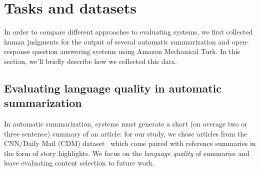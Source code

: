\section{\label{sec:price:tasks} Tasks and datasets}

In order to compare different approaches to evaluating systems, we first collected human judgments for the output of several automatic summarization and open-response question answering systems using Amazon Mechanical Turk.
In this section, we'll briefly describe how we collected this data.

\subsection{Evaluating language quality in automatic summarization}
In automatic summarization, systems must generate a short (on average two or three sentence) summary of an article: for our study, we chose articles from the CNN/Daily Mail (CDM) dataset~\citep{hermann2015read,nallapati2016abstractive} which come paired with reference summaries in the form of story highlights.
We focus on the \textit{language quality} of summaries and leave evaluating content selection to future work.

